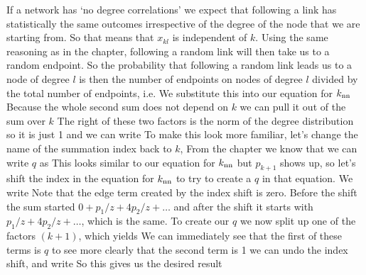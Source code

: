 \solution If a network has `no degree correlations' we expect that 
following a link has statistically the same outcomes irrespective of the degree of the node that we are starting from. So that means that 
$x_{kl}$ is independent of $k$. Using the same reasoning as in the chapter, following a random link will then take us to a random endpoint. So the probability that following a random link leads us to a node of degree $l$ is then the number of endpoints on nodes of degree $l$ divided by the total number of endpoints, i.e. 
We substitute this into our equation for $k_{\rm nn}$
Because the whole second sum does not depend on $k$ we can pull it out of the sum over $k$
The right of these two factors is the norm of the degree distribution so it is just 1 and we can write
To make this look more familiar, let's change the name of the summation index back to $k$,
From the chapter we know that we can write $q$ as 
This looks similar to our equation for $k_{\rm nn}$ but $p_{k+1}$ shows up, so let's shift the index in the equation for $k_{\rm nn}$ to try to create a $q$ in that equation. We write
Note that the edge term created by the index shift is zero. Before the shift the sum started $0+p_1/z+4p_2/z+\ldots$ and after the shift it starts with $p_1/z+4p_2/z+\ldots$, which is the same. To create our $q$ we now split up one of the factors $(k+1)$, which yields
We can immediately see that the first of these terms is $q$ to see more clearly that the second term is 1 we can undo the index shift, and write
So this gives us the desired result
